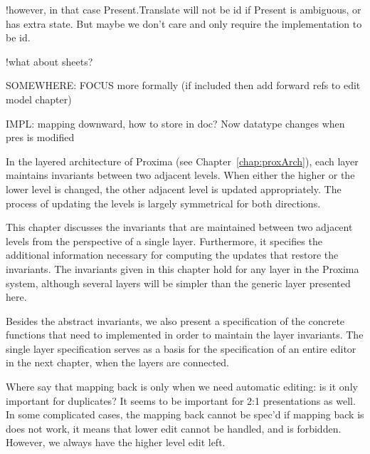 !however, in that case Present.Translate will not be id if Present is ambiguous, or 
has extra state. But maybe we don't care and only require the implementation to be id.

!what about sheets? 

SOMEWHERE: FOCUS more formally (if included then add forward refs to edit model chapter)


IMPL: mapping downward, how to store in doc? Now datatype changes when pres is modified

\ec



In the layered architecture of Proxima (see Chapter~\ref{chap:proxArch}), each layer maintains invariants between two adjacent levels. When either the higher or the lower level is changed, the other adjacent level is updated appropriately. The process of updating the levels is largely symmetrical for both directions.

This chapter discusses the invariants that are maintained between two adjacent levels from the perspective of a single layer. Furthermore, it specifies the additional information necessary for computing the updates that restore the invariants. The invariants given in this chapter hold for any layer in the Proxima system, although several layers will be simpler than the generic layer presented here.

Besides the abstract invariants, we also present a specification of the concrete functions that need to implemented in order to maintain the layer invariants. The single layer specification serves as a basis for the specification of an entire editor in the next chapter, when the layers are connected.




\bc
Where say that mapping back is only when we need automatic editing: is it only important for duplicates? It seems to be important for 2:1 presentations as well.  In some complicated cases, the mapping back cannot be spec'd if mapping back is does not work, it means that lower edit cannot be handled, and is forbidden. However, we always have the higher level edit left.
\ec


